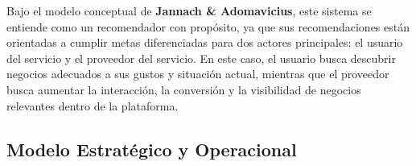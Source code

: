 \documentclass[11pt,a4paper]{article}
\begin{document}
Bajo el modelo conceptual de \textbf{Jannach \& Adomavicius}, este sistema se entiende como un recomendador con propósito, ya que sus recomendaciones están orientadas a cumplir metas diferenciadas para dos actores principales: el usuario del servicio y el proveedor del servicio. En este caso, el usuario busca descubrir negocios adecuados a sus gustos y situación actual, mientras que el proveedor busca aumentar la interacción, la conversión y la visibilidad de negocios relevantes dentro de la plataforma.

\vspace{0.5cm}

\subsection*{Modelo Estratégico y Operacional}
\end{document}

